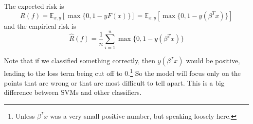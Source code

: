   \begin{theorem}[Risk]
    The expected risk is 
    \begin{equation}
      R(f) = \mathbb{E}_{x, y} \left[ \max\{0, 1 - y F(x) \}\right] = \mathbb{E}_{x, y} \left[ \max\{0, 1 - y (\beta^T x) \}\right]
    \end{equation}
    and the empirical risk is 
    \begin{equation}
      \hat{R}(f) = \frac{1}{n} \sum_{i=1}^n \max\{0, 1 - y (\beta^T x) \}
    \end{equation}
  \end{theorem}
  
  Note that if we classified something correctly, then $y(\beta^T x)$ would be positive, leading to the loss term being cut off to $0$.\footnote{Unless $\beta^T x$ was a very small positive number, but speaking loosely here.} So the model will focus only on the points that are wrong or that are most difficult to tell apart. This is a big difference between SVMs and other classifiers. 


